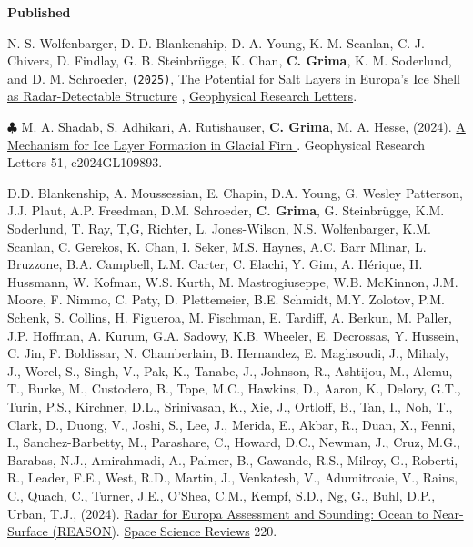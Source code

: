 \textbf{Published}

\begin{etaremune}

\item
  N. S. Wolfenbarger, D. D. Blankenship, D. A. Young, K. M. Scanlan, C. J. Chivers, D. Findlay, G. B. Steinbrügge, K. Chan, \textbf{C. Grima}, K. M. Soderlund, and D. M. Schroeder, \texttt{(2025)}, \href{https://agupubs.onlinelibrary.wiley.com/doi/full/10.1029/2024GL109144}{The Potential for Salt Layers in Europa’s Ice Shell as Radar-Detectable Structure} \aiOpenAccessSquare, \ul{Geophysical Research Letters}.

\item
  $\clubsuit$ M. A. Shadab, S. Adhikari, A. Rutishauser, \textbf{C. Grima}, M. A. Hesse, (2024). \href{https://doi.org/10.1029/2024GL109893}{A Mechanism for Ice Layer Formation in Glacial Firn \aiOpenAccessSquare}. Geophysical Research Letters 51, e2024GL109893.

\item
  D.D. Blankenship, A. Moussessian, E. Chapin, D.A. Young, G. Wesley Patterson, J.J. Plaut, A.P. Freedman, D.M. Schroeder, \textbf{C. Grima}, G. Steinbrügge, K.M. Soderlund, T. Ray, T,G, Richter, L. Jones-Wilson, N.S. Wolfenbarger, K.M. Scanlan, C. Gerekos, K. Chan, I. Seker, M.S. Haynes, A.C. Barr Mlinar, L. Bruzzone, B.A. Campbell, L.M. Carter, C. Elachi, Y. Gim, A. Hérique, H. Hussmann, W. Kofman, W.S. Kurth, M. Mastrogiuseppe, W.B. McKinnon, J.M. Moore, F. Nimmo, C. Paty, D. Plettemeier, B.E. Schmidt, M.Y. Zolotov, P.M. Schenk, S. Collins, H. Figueroa, M. Fischman, E. Tardiff, A. Berkun, M. Paller, J.P. Hoffman, A. Kurum, G.A. Sadowy, K.B. Wheeler, E. Decrossas, Y. Hussein, C. Jin, F. Boldissar, N. Chamberlain, B. Hernandez, E. Maghsoudi, J., Mihaly, J., Worel, S., Singh, V., Pak, K., Tanabe, J., Johnson, R., Ashtijou, M., Alemu, T., Burke, M., Custodero, B., Tope, M.C., Hawkins, D., Aaron, K., Delory, G.T., Turin, P.S., Kirchner, D.L., Srinivasan, K., Xie, J., Ortloff, B., Tan, I., Noh, T., Clark, D., Duong, V., Joshi, S., Lee, J., Merida, E., Akbar, R., Duan, X., Fenni, I., Sanchez-Barbetty, M., Parashare, C., Howard, D.C., Newman, J., Cruz, M.G., Barabas, N.J., Amirahmadi, A., Palmer, B., Gawande, R.S., Milroy, G., Roberti, R., Leader, F.E., West, R.D., Martin, J., Venkatesh, V., Adumitroaie, V., Rains, C., Quach, C., Turner, J.E., O’Shea, C.M., Kempf, S.D., Ng, G., Buhl, D.P., Urban, T.J., (2024). \href{https://doi.org/10.1007/s11214-024-01072-3}{Radar for Europa Assessment and Sounding: Ocean to Near-Surface (REASON)}. \ul{Space Science Reviews} 220. 



\end{etaremune}

